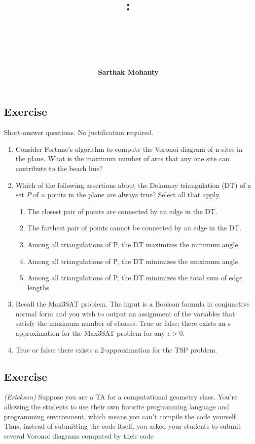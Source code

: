 \documentclass[14pt]{extreport}
\title{
    \vspace{1.75in}
    \textbf{\lectClass:\\ \lectTitle}\\
    \vspace{0.1in}\large{\textit{\lectClassInstructor\ \lectSection}}
    \vspace{2in}
    \author{\textbf{Sarthak Mohanty}}
    \date{}
}
\newcounter{counter}
\newcommand{\Exercise}{Exercise \stepcounter{counter}\thecounter}
\begin{document}
\maketitle
\pagebreak

\subsection*{\Exercise}
Short-answer questions. No justification required.
\begin{enumerate}
    \item Consider Fortune’s algorithm to compute the Voronoi diagram of n sites in
    the plane. What is the maximum number of arcs that any one site can contribute to the
    beach line?
    \item Which of the following assertions about the Delaunay triangulation (DT) of
    a set $P$ of $n$ points in the plane are always true? Select all that apply.
    \begin{enumerate}[label=\roman*.]
    \small
        \item The closest pair of points are connected by an edge in the DT.
        \item The farthest pair of points cannot be connected by an edge in the DT.
        \item Among all triangulations of P, the DT maximizes the minimum angle.
        \item Among all triangulations of P, the DT minimizes the maximum angle.
        \item Among all triangulations of P, the DT minimizes the total sum of edge lengths
    \end{enumerate}
    \item Recall the \textsf{Max3SAT} problem. The input is a Boolean formula in conjunctive normal form and you wish to output an assignment of the variables that satisfy the maximum number of clauses. True or false: there exists an $\epsilon$-approximation for the \textsf{Max3SAT} problem for any $\epsilon > 0$.
    \item True or false: there exists a 2-approximation for the TSP problem.
\end{enumerate}

\subsection*{\Exercise}
    \textit{(Erickson)} Suppose you are a TA for a computational geometry class. You’re allowing the students to use their own favorite programming language and programming environment, which means you can’t compile the code yourself. Thus, instead of submitting the code itself, you asked your students to submit several Voronoi diagrams computed by their code
    
\end{document}
